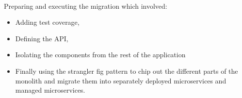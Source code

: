 \paragraph{}
Preparing and executing the migration which involved:

\begin{itemize}
    \item Adding test coverage,
    \item Defining the API,
    \item Isolating the components from the rest of the application
    \item Finally using the strangler fig pattern to chip out the different parts of the monolith and migrate them into separately deployed microservices and managed microservices.
\end{itemize}